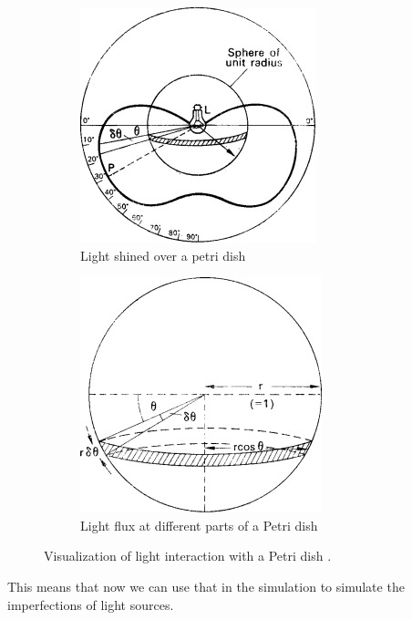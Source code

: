 \begin{figure}
    \centering
    \begin{subfigure}{.5\textwidth}
        \centering
        \includegraphics[width=\linewidth]{sphere2.jpg}
        \caption{Light shined over a petri dish}
        \label{fig:light-over-petri}
    \end{subfigure}%
    \begin{subfigure}{.5\textwidth}
        \centering
        \includegraphics[width=\linewidth]{sphere.jpg}
        \caption{Light flux at different parts of a Petri dish}
        \label{fig:light-flux-petri-dish}
    \end{subfigure}
    \caption{Visualization of light interaction with a Petri dish \citep{edwards_1970}.}
\end{figure}
This means that now we can use that in the simulation to simulate the imperfections of light sources. 


